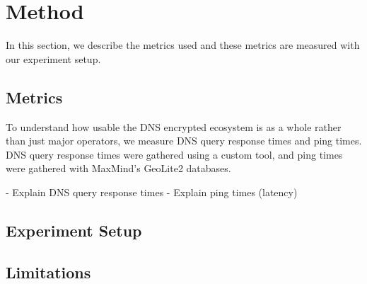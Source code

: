 \section{Method}\label{sec:method}

In this section, we describe the metrics used and these metrics are measured with our experiment setup.

\subsection{Metrics}
To understand how usable the DNS encrypted ecosystem is as a whole rather than just major operators, we measure DNS query response times and ping times. 
DNS query response times were gathered using a custom tool, and ping times were gathered with MaxMind's GeoLite2 databases.

- Explain DNS query response times
- Explain ping times (latency)

\subsection{Experiment Setup}

\subsection{Limitations}